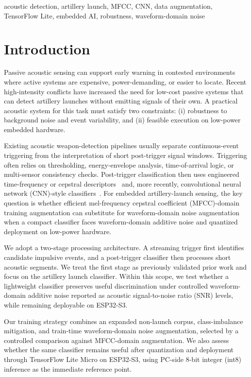 ﻿\documentclass[conference]{IEEEtran}
\begin{document}
\begin{IEEEkeywords}
acoustic detection, artillery launch, MFCC, CNN, data augmentation, TensorFlow Lite, embedded AI, robustness, waveform-domain noise
\end{IEEEkeywords}

\section{Introduction}
Passive acoustic sensing can support early warning in contested environments where active systems are expensive, power-demanding, or easier to locate. Recent high-intensity conflicts have increased the need for low-cost passive systems that can detect artillery launches without emitting signals of their own. A practical acoustic system for this task must satisfy two constraints: (i) robustness to background noise and event variability, and (ii) feasible execution on low-power embedded hardware.

Existing acoustic weapon-detection pipelines usually separate continuous-event triggering from the interpretation of short post-trigger signal windows. Triggering often relies on thresholding, energy-envelope analysis, time-of-arrival logic, or multi-sensor consistency checks. Post-trigger classification then uses engineered time-frequency or cepstral descriptors~\cite{desai2005he_cb,hohil2007variants,svatos2024fcc} and, more recently, convolutional neural network (CNN)-style classifiers~\cite{piczak2015esc_cnn,raponi2022sound_of_guns}. For embedded artillery-launch sensing, the key question is whether efficient mel-frequency cepstral coefficient (MFCC)-domain training augmentation can substitute for waveform-domain noise augmentation when a compact classifier faces waveform-domain additive noise and quantized deployment on low-power hardware.

We adopt a two-stage processing architecture. A streaming trigger first identifies candidate impulsive events, and a post-trigger classifier then processes short acoustic segments. We treat the first stage as previously validated prior work and focus on the artillery launch classifier. Within this scope, we test whether a lightweight classifier preserves useful discrimination under controlled waveform-domain additive noise reported as acoustic signal-to-noise ratio (SNR) levels, while remaining deployable on ESP32-S3.

Our training strategy combines an expanded non-launch corpus, class-imbalance mitigation, and train-time waveform-domain noise augmentation, selected by a controlled comparison against MFCC-domain augmentation. We also assess whether the same classifier remains useful after quantization and deployment through TensorFlow Lite Micro on ESP32-S3, using PC-side 8-bit integer (int8) inference as the immediate reference point.
\end{document}
